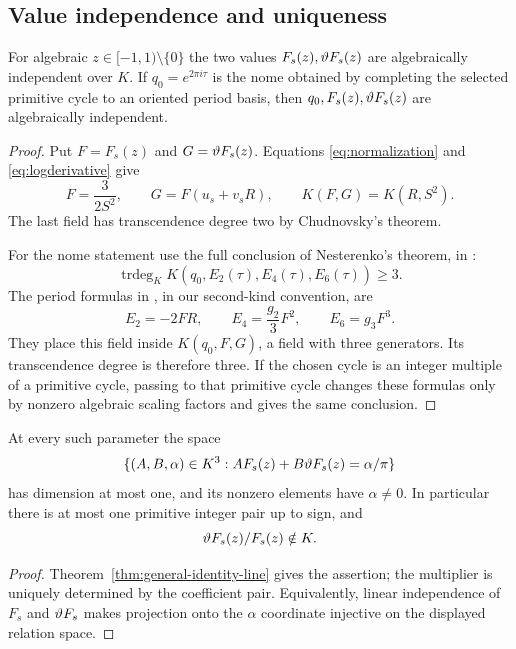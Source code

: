 \subsection{Value independence and uniqueness}\label{sec:unique}
\begin{theorem}\label{thm:B-value-independent}
For algebraic $z\in[-1,1)\setminus\{0\}$ the two values
$F_s(z),\vartheta F_s(z)$ are algebraically independent over $K$.
If $q_0=e^{2\pi i\tau}$ is the nome obtained by completing the
selected primitive cycle to an oriented period basis, then
$q_0,F_s(z),\vartheta F_s(z)$ are algebraically independent.
\end{theorem}
\begin{proof}
Put $F=F_s(z)$ and $G=\vartheta F_s(z)$. Equations
\eqref{eq:normalization} and \eqref{eq:logderivative} give
\[
 F=\frac3{2S^2},\qquad G=F(u_s+v_sR),\qquad
 K(F,G)=K(R,S^2).
\]
The last field has transcendence degree two by Chudnovsky's theorem.

For the nome statement use the full conclusion of Nesterenko's
theorem, in \cite[Theorem~1.1]{Fonseca}:
\[
 \operatorname{trdeg}_K K(q_0,E_2(\tau),E_4(\tau),E_6(\tau))\ge3.
\]
The period formulas in \cite[Proposition~4.7]{Fonseca}, in our
second-kind convention, are
\[
 E_2=-2FR,\qquad E_4=\frac{g_2}{3}F^2,\qquad E_6=g_3F^3.
\]
They place this field inside $K(q_0,F,G)$, a field with three
generators. Its transcendence degree is therefore three. If the
chosen cycle is an integer multiple of a primitive cycle, passing
to that primitive cycle changes these formulas only by nonzero
algebraic scaling factors and gives the same conclusion.
\end{proof}

\begin{corollary}\label{prop:B-relation-space}
At every such parameter the space
\[
 \{(A,B,\alpha)\in K^3:AF_s(z)+B\vartheta F_s(z)=\alpha/\pi\}
\]
has dimension at most one, and its nonzero elements have
$\alpha\ne0$. In particular there is at most one primitive integer
pair up to sign, and
\begin{equation}\label{eq:translog}
                    \vartheta F_s(z)/F_s(z)\notin K.
\end{equation}
\end{corollary}
\begin{proof}
Theorem~\ref{thm:general-identity-line} gives the assertion; the
multiplier is uniquely determined by the coefficient pair. Equivalently,
linear independence of $F_s$ and $\vartheta F_s$ makes projection onto
the $\alpha$ coordinate injective on the displayed relation space.
\end{proof}

